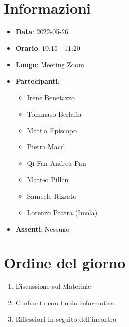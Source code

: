 \section{Informazioni}
	\begin{itemize}
		\item \textbf{Data}: 2022-05-26     %
		\item \textbf{Orario}: 10:15 - 11:20     %
		\item \textbf{Luogo}: Meeting Zoom
		\item \textbf{Partecipanti}:
		\begin{itemize}
			\item Irene Benetazzo
			\item Tommaso Berlaffa
			\item Mattia Episcopo
			\item Pietro Macrì
			\item Qi Fan Andrea Pan
			\item Matteo Pillon
			\item Samuele Rizzato
			\item Lorenzo Patera (Imola)
		\end{itemize}
        \item \textbf{Assenti}: Nessuno
	\end{itemize}
    
	\section{Ordine del giorno}
	\begin{enumerate}
		\item Discussione sul Materiale
    \item Confronto con Imola Informatica
    \item Riflessioni in seguito dell'incontro
		
	\end{enumerate}
	\newpage